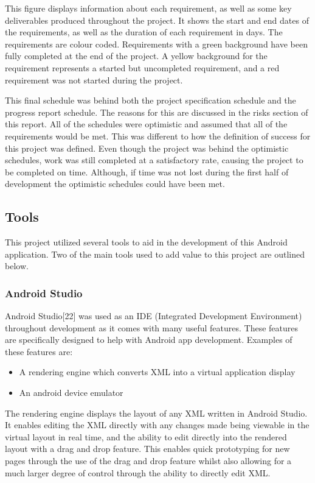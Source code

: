 \documentclass{article}
\begin{document}
This figure displays information about each requirement, as well as some key deliverables produced throughout the project. It shows the start and end dates of the requirements, as well as the duration of each requirement in days. The requirements are colour coded. Requirements with a green background have been fully completed at the end of the project. A yellow background for the requirement represents a started but uncompleted requirement, and a red requirement was not started during the project. \par

This final schedule was behind both the project specification schedule and the progress report schedule. The reasons for this are discussed in the risks section of this report. All of the schedules were optimistic and assumed that all of the requirements would be met. This was different to how the definition of success for this project was defined. Even though the project was behind the optimistic schedules, work was still completed at a satisfactory rate, causing the project to be completed on time. Although, if time was not lost during the first half of development the optimistic schedules could have been met. \par

\subsection{Tools}

This project utilized several tools to aid in the development of this Android application. Two of the main tools used to add value to this project are outlined below.

\subsubsection{Android Studio}

Android Studio[22] was used as an IDE (Integrated Development Environment) throughout development as it comes with many useful features. These features are specifically designed to help with Android app development. Examples of these features are: 

\begin{itemize}
	\item A rendering engine which converts XML into a virtual application display
	\item An android device emulator
\end{itemize}

The rendering engine displays the layout of any XML written in Android Studio. It enables editing the XML directly with any changes made being viewable in the virtual layout in real time, and the ability to edit directly into the rendered layout with a drag and drop feature. This enables quick prototyping for new pages through the use of the drag and drop feature whilst also allowing for a much larger degree of control through the ability to directly edit XML. \par
\end{document}
